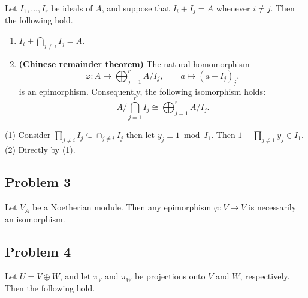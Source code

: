 Let \(I_1,\ldots,I_r\) be ideals of \(A\), and suppose that
\(I_i+I_j=A\) whenever \(i\ne j\). Then the following hold.

\begin{enumerate}
    \item[(i)] \(I_i+\bigcap_{j\ne i} I_j=A\).
    \item[(ii)] \textbf{(Chinese remainder theorem)} The natural homomorphism
    \[
    \varphi:A\longrightarrow \bigoplus_{j=1}^r A/I_j,
    \qquad
    a\longmapsto (a+I_j)_j,
    \]
    is an epimorphism. Consequently, the following isomorphism holds:
    \[
    A\bigg/\bigcap_{j=1}^r I_j
    \cong
    \bigoplus_{j=1}^r A/I_j.
    \]
\end{enumerate}
\begin{solution}
    (1) Consider $\prod_{j\neq i}I_j \subseteq \cap_{j\neq i}I_j$ then let $y_j \equiv 1\bmod I_1$. Then $1-\prod_{j\neq 1}y_j\in I_1$.
    (2) Directly by (1).
\end{solution}


\subsection{Problem 3}

Let \(V_A\) be a Noetherian module. Then any epimorphism
\(\varphi:V\to V\) is necessarily an isomorphism.



\subsection{Problem 4}

Let \(U=V\oplus W\), and let \(\pi_V\) and \(\pi_W\) be projections onto
\(V\) and \(W\), respectively. Then the following hold.

